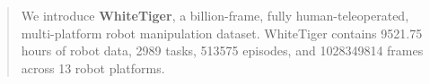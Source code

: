 \begin{abstract}
We introduce \textbf{WhiteTiger}, a billion-frame, fully human-teleoperated, multi-platform robot manipulation dataset. WhiteTiger contains 9521.75 hours of robot data, 2989 tasks, 513575 episodes, and 1028349814 frames across 13 robot platforms.
\end{abstract}
